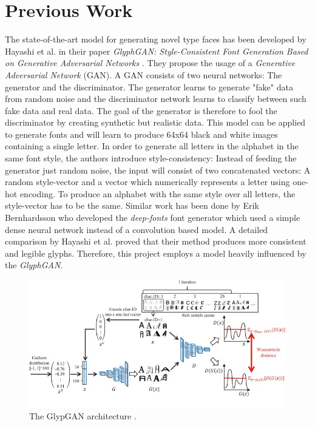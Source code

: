 \documentclass[11pt]{article}
\begin{document}
\section{Previous Work}
The state-of-the-art model for generating novel type faces has been developed by Hayashi et al. in their paper \emph{GlyphGAN: Style-Consistent Font Generation Based on Generative Adversarial Networks} \cite{glyphGan}. They propose the usage of a \emph{Generative Adversarial Network} \cite{gan} (GAN). A GAN consists of two neural networks: The generator and the discriminator. The generator learns to generate "fake" data from random noise and the discriminator network learns to classify between such fake data and real data. The goal of the generator is therefore to fool the discriminator by creating synthetic but realistic data. This model can be applied to generate fonts and will learn to produce 64x64 black and white images containing a single letter. In order to generate all letters in the alphabet in the same font style, the authors introduce style-consistency: Instead of feeding the generator just random noise, the input will consist of two concatenated vectors: A random style-vector and a vector which numerically represents a letter using one-hot encoding. To produce an alphabet with the same style over all letters, the style-vector has to be the same.
Similar work has been done by Erik Bernhardsson who developed the \emph{deep-fonts} \cite{deepFonts} font generator which used a simple dense neural network instead of a convolution based model.
A detailed comparison by Hayashi et al. proved that their method produces more consistent and legible glyphs. Therefore, this project employs a model heavily influenced by the \emph{GlyphGAN}.

\begin{figure}
    \centering
    \includegraphics[width=0.75\columnwidth]{glyphgan.png}
    \caption{The GlypGAN architecture \cite{glyphGanImage}.}
    \label{fig:glyphgan}
\end{figure}
\end{document}

